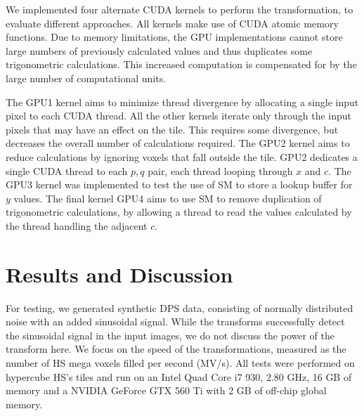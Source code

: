\documentclass[11pt,twoside]{article}
\begin{document}
We implemented four alternate CUDA kernels to perform the transformation, to evaluate different approaches.
All kernels make use of CUDA atomic memory functions.
Due to memory limitations, the GPU implementations cannot store large numbers of previously calculated values and thus duplicates some trigonometric calculations.
This increased computation is compensated for by the large number of computational units.

The GPU1 kernel aims to minimize thread divergence by allocating a single input pixel to each CUDA thread.
All the  other kernels iterate only through the input pixels that may have an effect on the tile.
This requires some divergence, but decreases the overall number of calculations required.
The GPU2 kernel aims to reduce calculations by ignoring voxels that fall outside the tile.
GPU2 dedicates a single CUDA thread to each $p,q$ pair, each thread looping through $x$ and $c$.
The GPU3 kernel was implemented to test the use of SM to store a lookup buffer for $y$ values.
The final kernel GPU4 aims to use SM to remove duplication of trigonometric calculations, by allowing a thread to read the values calculated by the thread handling the adjacent $c$.

\section{Results and Discussion}
\label{eval}

For testing, we generated synthetic DPS data, consisting of normally distributed noise with an added sinusoidal signal.
While the transforms successfully detect the sinusoidal signal in the input images, we do not discuss the power of the transform here.
We focus on the speed of the transformations, measured as the number of HS mega voxels filled per second (MV/s).  
All tests were performed on hypercube HS's tiles and run on an Intel Quad Core i7 930, 2.80 GHz, 16 GB of memory and a NVIDIA GeForce GTX 560 Ti with 2 GB of off-chip global memory.
\end{document}
